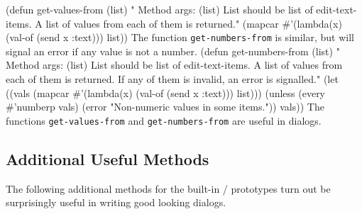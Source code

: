 \nwenddocs{}\plusendmoddef
(defun get-values-from (list)
" Method args: (list)
List should be list of edit-text-items. A list of values from each of
them is returned."
  (mapcar #'(lambda(x) (val-of (send x :text))) list))
\eatline
{}\nwendcode{}\nwdocspar
The function {\tt{}get-numbers-from} is similar, but will signal an error
if any value is not a number.
\nwenddocs{}\plusendmoddef
(defun get-numbers-from (list)
" Method args: (list)
List should be list of edit-text-items. A list of values from each of
them is returned.  If any of them is invalid, an error is signalled."
  (let ((vals (mapcar #'(lambda(x) (val-of (send x :text))) list)))
     (unless (every #'numberp vals)
        (error "Non-numeric values in some items."))
     vals))
\eatline
{}\nwendcode{}\nwdocspar
The functions {\tt{}get-values-from} and {\tt{}get-numbers-from} are useful
in dialogs. 

\subsection{Additional Useful Methods}
\label{sec:additional-methods}
The following additional methods for the built-in \xls/ prototypes
turn out be surprisingly useful in writing good looking dialogs.


